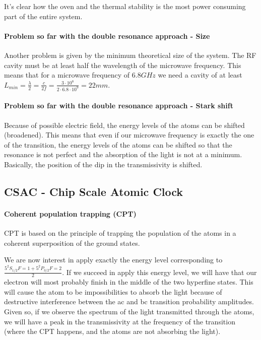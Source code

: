 It's clear how the oven and the thermal stability is the most power consuming part of the entire system.

\paragraph{Problem so far with the double resonance approach - Size}

Another problem is given by the minimum theoretical size of the system.
The RF cavity must be at least half the wavelength of the microwave frequency.
This means that for a microwave frequency of $6.8GHz$ we need a cavity of at least $L_{min} = \frac{\lambda}{2} = \frac{c}{2f} = \frac{3 \cdot 10^8}{2 \cdot 6.8 \cdot 10^9} = 22mm$.

\paragraph{Problem so far with the double resonance approach - Stark shift}

Because of possible electric field, the energy levels of the atoms can be shifted (broadened).
This means that even if our microwave frequency is exactly the one of the transition, the energy levels of the atoms can be shifted so that the resonance is not perfect and the absorption of the light is not at a minimum.
Basically, the position of the dip in the transmissivity is shifted.

\subsection{CSAC - Chip Scale Atomic Clock}

\paragraph{Coherent population trapping (CPT)}

CPT is based on the principle of trapping the population of the atoms in a coherent superposition of the ground states.

We are now interest in apply exactly the energy level corresponding to $\frac{5^2S_{1/2} F=1 + 5^2P_{3/2} F=2}{2}$.
If we succeed in apply this energy level, we will have that our electron will most probably finish in the middle of the two hyperfine states.
This will cause the atom to be impossibilities to absorb the light because of destructive interference between the ac and bc transition probability amplitudes.
Given so, if we observe the spectrum of the light transmitted through the atoms, we will have a peak in the transmissivity at the frequency of the transition (where the CPT happens, and the atoms are not absorbing the light).

